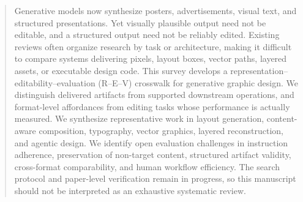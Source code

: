 \begin{abstract}
Generative models now synthesize posters, advertisements, visual text, and structured presentations. Yet visually plausible output need not be editable, and a structured output need not be reliably edited. Existing reviews often organize research by task or architecture, making it difficult to compare systems delivering pixels, layout boxes, vector paths, layered assets, or executable design code. This survey develops a representation--editability--evaluation (R--E--V) crosswalk for generative graphic design. We distinguish delivered artifacts from supported downstream operations, and format-level affordances from editing tasks whose performance is actually measured. We synthesize representative work in layout generation, content-aware composition, typography, vector graphics, layered reconstruction, and agentic design. We identify open evaluation challenges in instruction adherence, preservation of non-target content, structured artifact validity, cross-format comparability, and human workflow efficiency. The search protocol and paper-level verification remain in progress, so this manuscript should not be interpreted as an exhaustive systematic review.
\end{abstract}
